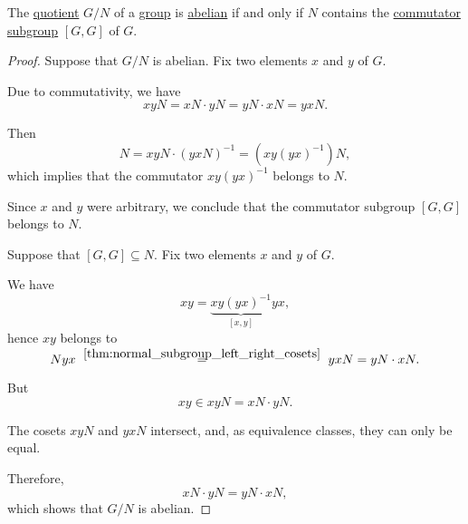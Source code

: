 \begin{proposition}\label{thm:quotient_is_abelian_iff_subgroup_contains_commutator}
  The \hyperref[def:group/quotient]{quotient} \( G / N \) of a \hyperref[def:group]{group} is \hyperref[def:abelian_group]{abelian} if and only if \( N \) contains the \hyperref[def:group_commutator]{commutator subgroup} \( [G, G] \) of \( G \).
\end{proposition}
\begin{proof}
  \SufficiencySubProof Suppose that \( G / N \) is abelian. Fix two elements \( x \) and \( y \) of \( G \).

  Due to commutativity, we have
  \begin{equation*}
    xyN = xN \cdot yN = yN \cdot xN = yxN.
  \end{equation*}

  Then
  \begin{equation*}
    N = xyN \cdot (yxN)^{-1} = (xy(yx)^{-1})N,
  \end{equation*}
  which implies that the commutator \( xy(yx)^{-1} \) belongs to \( N \).

  Since \( x \) and \( y \) were arbitrary, we conclude that the commutator subgroup \( [G, G] \) belongs to \( N \).

  \NecessitySubProof Suppose that \( [G, G] \subseteq N \). Fix two elements \( x \) and \( y \) of \( G \).

  We have
  \begin{equation*}
    xy = \underbrace{xy (yx)^{-1}}_{[x, y]} yx,
  \end{equation*}
  hence \( xy \) belongs to
  \begin{equation*}
    Nyx
    \reloset {\ref{thm:normal_subgroup_left_right_cosets}} =
    yxN
    =
    yN \cdot xN.
  \end{equation*}

  But
  \begin{equation*}
    xy \in xyN = xN \cdot yN.
  \end{equation*}

  The cosets \( xyN \) and \( yxN \) intersect, and, as equivalence classes, they can only be equal.

  Therefore,
  \begin{equation*}
    xN \cdot yN = yN \cdot xN,
  \end{equation*}
  which shows that \( G / N \) is abelian.
\end{proof}

